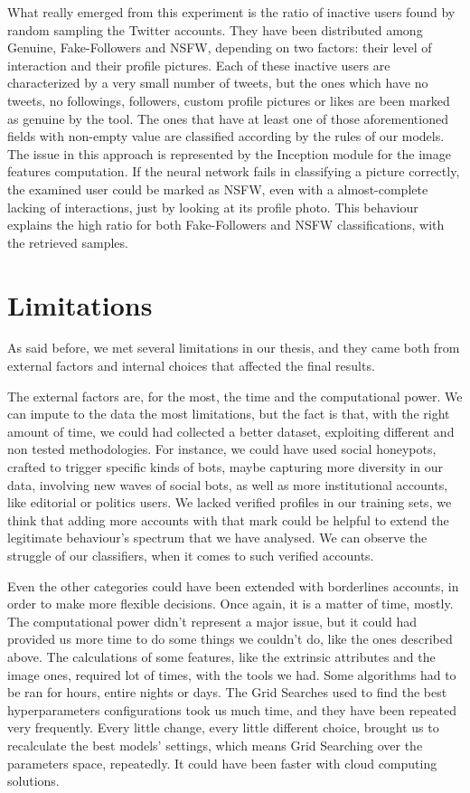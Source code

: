 What really emerged from this experiment is the ratio of inactive users found by random sampling the Twitter accounts. They have been distributed among Genuine, Fake-Followers and NSFW, depending on two factors: their level of interaction and their profile pictures.
Each of these inactive users are characterized by a very small number of tweets, but the ones which have no tweets, no followings, followers, custom profile pictures or likes are been marked as genuine by the tool. The ones that have at least one of those aforementioned fields with non-empty value are classified according by the rules of our models. The issue in this approach is represented by the Inception module for the image features computation. If the neural network fails in classifying a picture correctly, the examined user could be marked as NSFW, even with a almost-complete lacking of interactions, just by looking at its profile photo. This behaviour explains the high ratio for both Fake-Followers and NSFW classifications, with the retrieved samples.

\section{Limitations}
As said before, we met several limitations in our thesis, and they came both from external factors and internal choices that affected the final results.

The external factors are, for the most, the time and the computational power.
We can impute to the data the most limitations, but the fact is that, with the right amount of time, we could had collected a better dataset, exploiting different and non tested methodologies. For instance, we could have used social honeypots, crafted to trigger specific kinds of bots, maybe capturing more diversity in our data, involving new waves of social bots, as well as more institutional accounts, like editorial or politics users. We lacked verified profiles in our training sets, we think that adding more accounts with that mark could be helpful to extend the legitimate behaviour's spectrum that we have analysed. We can observe the struggle of our classifiers, when it comes to such verified accounts.

Even the other categories could have been extended with borderlines accounts, in order to make more flexible decisions. Once again, it is a matter of time, mostly.
The computational power didn't represent a major issue, but it could had provided us more time to do some things we couldn't do, like the ones described above.
The calculations of some features, like the extrinsic attributes and the image ones, required lot of times, with the tools we had. Some algorithms had to be ran for hours, entire nights or days. The Grid Searches used to find the best hyperparameters configurations took us much time, and they have been repeated very frequently. Every little change, every little different choice, brought us to recalculate the best models' settings, which means Grid Searching over the parameters space, repeatedly.
It could have been faster with cloud computing solutions.

